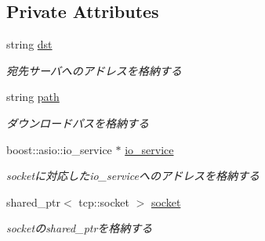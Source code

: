 \subsection*{Private Attributes}
\begin{DoxyCompactItemize}
\item 
\mbox{\label{class_session_1_1_http_get_sequence_a7d3da13220f1cb852254aedf19cfd356}} 
string \mbox{\hyperlink{class_session_1_1_http_get_sequence_a7d3da13220f1cb852254aedf19cfd356}{dst}}
\begin{DoxyCompactList}\small\item\em 宛先サーバへのアドレスを格納する \end{DoxyCompactList}\item 
\mbox{\label{class_session_1_1_http_get_sequence_ad9340442fa9af61603ed99d81a601a96}} 
string \mbox{\hyperlink{class_session_1_1_http_get_sequence_ad9340442fa9af61603ed99d81a601a96}{path}}
\begin{DoxyCompactList}\small\item\em ダウンロードパスを格納する \end{DoxyCompactList}\item 
\mbox{\label{class_session_1_1_http_get_sequence_a8837d7849dfc1c24fe4c139650e18fb9}} 
boost\+::asio\+::io\+\_\+service $\ast$ \mbox{\hyperlink{class_session_1_1_http_get_sequence_a8837d7849dfc1c24fe4c139650e18fb9}{io\+\_\+service}}
\begin{DoxyCompactList}\small\item\em socketに対応したio\+\_\+serviceへのアドレスを格納する \end{DoxyCompactList}\item 
\mbox{\label{class_session_1_1_http_get_sequence_a306d423aa5fea9785ae8e7f31db0eb73}} 
shared\+\_\+ptr$<$ tcp\+::socket $>$ \mbox{\hyperlink{class_session_1_1_http_get_sequence_a306d423aa5fea9785ae8e7f31db0eb73}{socket}}
\begin{DoxyCompactList}\small\item\em socketのshared\+\_\+ptrを格納する \end{DoxyCompactList}\item 
\mbox{\label{class_session_1_1_http_get_sequence_a3ce12aa9298adc25900145fe16e874da}} 

\end{DoxyCompactItemize}
